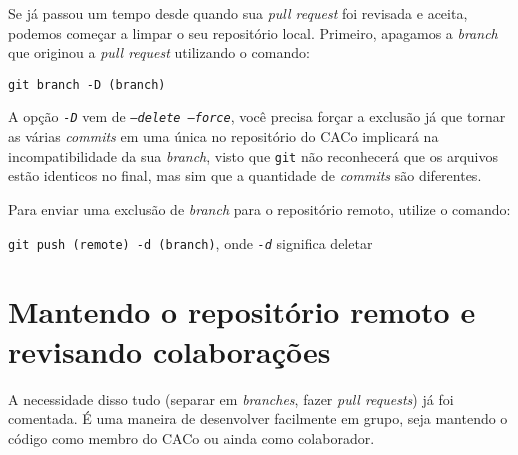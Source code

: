 \documentclass[a4paper,oneside,10pt]{memoir}
\begin{document}
Se já passou um tempo desde quando sua \emph{pull request} foi revisada e
aceita, podemos começar a limpar o seu repositório local. Primeiro, apagamos a
\emph{branch} que originou a \emph{pull request} utilizando o comando:

\begin{center}
\texttt{git branch -D (branch)}
\end{center}

A opção \emph{\texttt{-D}} vem de \emph{\texttt{--delete --force}}, você
precisa forçar a exclusão já que tornar as várias \emph{commits} em uma única
no repositório do CACo implicará na incompatibilidade da sua \emph{branch},
visto que \texttt{git} não reconhecerá que os arquivos estão identicos no
final, mas sim que a quantidade de \emph{commits} são diferentes.

Para enviar uma exclusão de \emph{branch} para o repositório remoto, utilize o
comando:

\begin{center}
\texttt{git push (remote) -d (branch)}, onde \emph{\texttt{-d}} significa
deletar
\end{center}


\chapter{Mantendo o repositório remoto e revisando colaborações}

A necessidade disso tudo (separar em \emph{branches}, fazer \emph{pull
requests}) já foi comentada. É uma maneira de desenvolver facilmente em grupo,
seja mantendo o código como membro do CACo ou ainda como colaborador.
\end{document}
